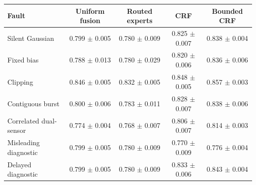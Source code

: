 \begin{tabular}{lcccc}
\toprule
Fault & Uniform fusion & Routed experts & CRF & Bounded CRF \\
\midrule
Silent Gaussian & 0.799 $\pm$ 0.005 & 0.780 $\pm$ 0.009 & 0.825 $\pm$ 0.007 & 0.838 $\pm$ 0.004 \\
Fixed bias & 0.788 $\pm$ 0.013 & 0.780 $\pm$ 0.029 & 0.820 $\pm$ 0.006 & 0.836 $\pm$ 0.006 \\
Clipping & 0.846 $\pm$ 0.005 & 0.832 $\pm$ 0.005 & 0.848 $\pm$ 0.005 & 0.857 $\pm$ 0.003 \\
Contiguous burst & 0.800 $\pm$ 0.006 & 0.783 $\pm$ 0.011 & 0.828 $\pm$ 0.007 & 0.838 $\pm$ 0.006 \\
Correlated dual-sensor & 0.774 $\pm$ 0.004 & 0.768 $\pm$ 0.007 & 0.806 $\pm$ 0.007 & 0.814 $\pm$ 0.003 \\
Misleading diagnostic & 0.799 $\pm$ 0.005 & 0.780 $\pm$ 0.009 & 0.770 $\pm$ 0.009 & 0.776 $\pm$ 0.004 \\
Delayed diagnostic & 0.799 $\pm$ 0.005 & 0.780 $\pm$ 0.009 & 0.833 $\pm$ 0.006 & 0.843 $\pm$ 0.004 \\
\bottomrule
\end{tabular}
